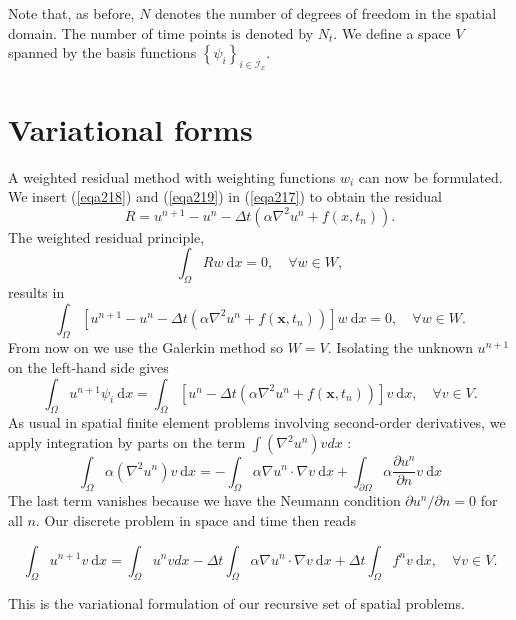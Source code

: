 \documentclass[../main.tex]{subfiles}
\begin{document}
		\noindent Note that, as before, $N$ denotes the number of degrees of freedom in the spatial domain. The number of time points is denoted by $N_{t}$. We define a space $V$ spanned by the basis functions $\left\{\psi_{i}\right\}_{i \in \mathcal{I}_{x}}$. \bigbreak 
	
	\section[Variational forms]{Variational forms}	
	\label{sec:sec_19_2}
		\noindent A weighted residual method with weighting functions $w_{i}$ can now be formulated. We insert (\ref{eqa218}) and (\ref{eqa219}) in (\ref{eqa217}) to obtain the residual
		$$
		R=u^{n+1}-u^{n}-\Delta t\left(\alpha \nabla^{2} u^{n}+f\left(x, t_{n}\right)\right) .
		$$
		The weighted residual principle,
		$$
		\int_{\Omega} R w \mathrm{~d} x=0, \quad \forall w \in W,
		$$
		results in
		$$
		\int_{\Omega}\left[u^{n+1}-u^{n}-\Delta t\left(\alpha \nabla^{2} u^{n}+f\left(\boldsymbol{x}, t_{n}\right)\right)\right] w \mathrm{~d} x=0, \quad \forall w \in W .
		$$
		From now on we use the Galerkin method so $W=V$. Isolating the unknown $u^{n+1}$ on the left-hand side gives
		$$
		\int_{\Omega} u^{n+1} \psi_{i} \mathrm{~d} x=\int_{\Omega}\left[u^{n}-\Delta t\left(\alpha \nabla^{2} u^{n}+f\left(\boldsymbol{x}, t_{n}\right)\right)\right] v \mathrm{~d} x, \quad \forall v \in V .
		$$
		As usual in spatial finite element problems involving second-order derivatives, we apply integration by parts on the term $\int\left(\nabla^{2} u^{n}\right) v d x$ :
		$$
		\int_{\Omega} \alpha\left(\nabla^{2} u^{n}\right) v \mathrm{~d} x=-\int_{\Omega} \alpha \nabla u^{n} \cdot \nabla v \mathrm{~d} x+\int_{\partial \Omega} \alpha \frac{\partial u^{n}}{\partial n} v \mathrm{~d} x
		$$
		\noindent The last term vanishes because we have the Neumann condition $\partial u^{n} / \partial n=0$ for all $n$. Our discrete problem in space and time then reads
	
	\begin{equation}
	\label{eqa220}	
		\int_{\Omega} u^{n+1} v \mathrm{~d} x=\int_{\Omega} u^{n} v d x-\Delta t \int_{\Omega} \alpha \nabla u^{n} \cdot \nabla v \mathrm{~d} x+\Delta t \int_{\Omega} f^{n} v \mathrm{~d} x, \quad \forall v \in V .
	\end{equation}

		This is the variational formulation of our recursive set of spatial problems.
		
\end{document}
